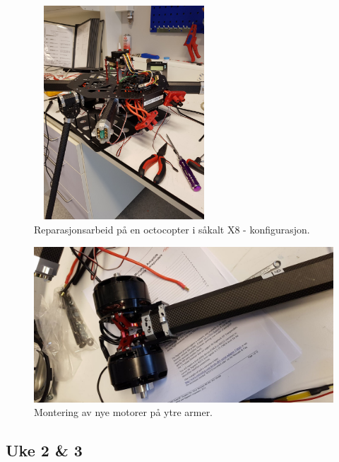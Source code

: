 \documentclass[12pt, a4paper]{report}
\begin{document}
\begin{figure}[h]
	\centering
	\includegraphics[height = 8cm, width = 0.6\textwidth]{octocopt_x8.jpg}
	\caption{Reparasjonsarbeid på en octocopter i såkalt X8 - konfigurasjon.}
\end{figure}
\begin{figure}[h]
	\centering
	\includegraphics[scale=.2]{octarm_x8.jpg}
	\caption{Montering av nye motorer på ytre armer.}
\end{figure}

\subsection{Uke 2 \& 3}
\end{document}
